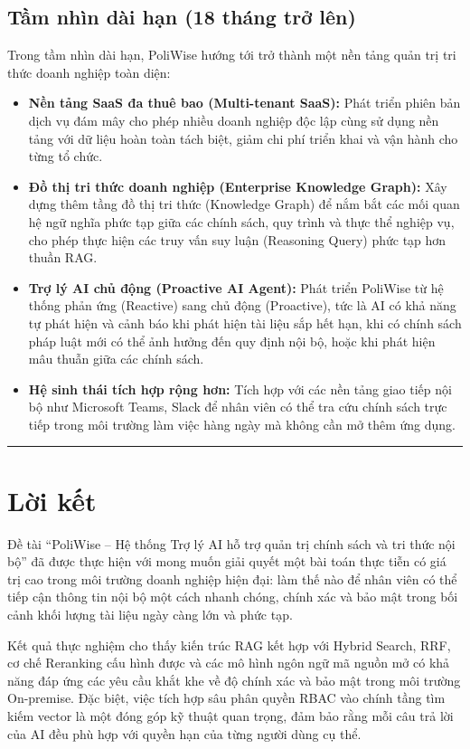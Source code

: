 \documentclass[12pt,a4paper]{report}
\begin{document}
\subsection{Tầm nhìn dài hạn (18 tháng trở lên)}

Trong tầm nhìn dài hạn, PoliWise hướng tới trở thành một nền tảng quản trị tri thức doanh nghiệp toàn diện:

\begin{itemize}
    \item \textbf{Nền tảng SaaS đa thuê bao (Multi-tenant SaaS):} Phát triển phiên bản dịch vụ đám mây cho phép nhiều doanh nghiệp độc lập cùng sử dụng nền tảng với dữ liệu hoàn toàn tách biệt, giảm chi phí triển khai và vận hành cho từng tổ chức.
    \item \textbf{Đồ thị tri thức doanh nghiệp (Enterprise Knowledge Graph):} Xây dựng thêm tầng đồ thị tri thức (Knowledge Graph) để nắm bắt các mối quan hệ ngữ nghĩa phức tạp giữa các chính sách, quy trình và thực thể nghiệp vụ, cho phép thực hiện các truy vấn suy luận (Reasoning Query) phức tạp hơn thuần RAG.
    \item \textbf{Trợ lý AI chủ động (Proactive AI Agent):} Phát triển PoliWise từ hệ thống phản ứng (Reactive) sang chủ động (Proactive), tức là AI có khả năng tự phát hiện và cảnh báo khi phát hiện tài liệu sắp hết hạn, khi có chính sách pháp luật mới có thể ảnh hưởng đến quy định nội bộ, hoặc khi phát hiện mâu thuẫn giữa các chính sách.
    \item \textbf{Hệ sinh thái tích hợp rộng hơn:} Tích hợp với các nền tảng giao tiếp nội bộ như Microsoft Teams, Slack để nhân viên có thể tra cứu chính sách trực tiếp trong môi trường làm việc hàng ngày mà không cần mở thêm ứng dụng.
\end{itemize}

\rule{\textwidth}{0.5pt}

\section{Lời kết}

Đề tài ``PoliWise -- Hệ thống Trợ lý AI hỗ trợ quản trị chính sách và tri thức nội bộ'' đã được thực hiện với mong muốn giải quyết một bài toán thực tiễn có giá trị cao trong môi trường doanh nghiệp hiện đại: làm thế nào để nhân viên có thể tiếp cận thông tin nội bộ một cách nhanh chóng, chính xác và bảo mật trong bối cảnh khối lượng tài liệu ngày càng lớn và phức tạp.

Kết quả thực nghiệm cho thấy kiến trúc RAG kết hợp với Hybrid Search, RRF, cơ chế Reranking cấu hình được và các mô hình ngôn ngữ mã nguồn mở có khả năng đáp ứng các yêu cầu khắt khe về độ chính xác và bảo mật trong môi trường On-premise. Đặc biệt, việc tích hợp sâu phân quyền RBAC vào chính tầng tìm kiếm vector là một đóng góp kỹ thuật quan trọng, đảm bảo rằng mỗi câu trả lời của AI đều phù hợp với quyền hạn của từng người dùng cụ thể.
\end{document}
